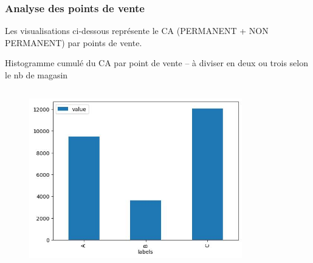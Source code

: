 \documentclass{beamer}
\begin{document}
    \begin{frame}
        \tiny
        \frametitle{Analyse des points de vente}

        Les visualisations ci-dessous représente le CA (PERMANENT + NON PERMANENT) par points de vente.\par

        {Histogramme cumulé du CA par point de vente – à diviser en deux ou trois selon le nb de magasin}

        
                    \begin{columns}
                                    \begin{column}{0.3333333333333333\textwidth}
                        \begin{center}
                            \begin{figure}[h]
                                \includegraphics[width=1\textwidth]{assets/ca_0.jpg}
                                \centering
                            \end{figure}
                        \end{center}
                    \end{column}
                                    \begin{column}{0.3333333333333333\textwidth}
                        \begin{center}
                            \begin{figure}[h]

\end{figure}
\end{center}
\end{column}
\end{columns}
\end{frame}
\end{document}
